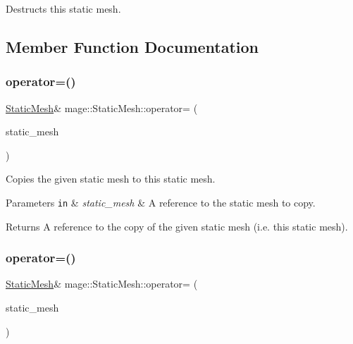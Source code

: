 Destructs this static mesh. 

\subsection{Member Function Documentation}
\hypertarget{classmage_1_1_static_mesh_af73dd102f2de9cf7529e380895cfc8ff}{}\label{classmage_1_1_static_mesh_af73dd102f2de9cf7529e380895cfc8ff} 
\subsubsection{\texorpdfstring{operator=()}{operator=()}\hspace{0.1cm}{\footnotesize\ttfamily [1/2]}}
{\footnotesize\ttfamily \hyperlink{classmage_1_1_static_mesh}{Static\+Mesh}\& mage\+::\+Static\+Mesh\+::operator= (\begin{DoxyParamCaption}\item[{const \hyperlink{classmage_1_1_static_mesh}{Static\+Mesh} \&}]{static\+\_\+mesh }\end{DoxyParamCaption})\hspace{0.3cm}{\ttfamily [delete]}}

Copies the given static mesh to this static mesh.


\begin{DoxyParams}[1]{Parameters}
\mbox{\tt in}  & {\em static\+\_\+mesh} & A reference to the static mesh to copy. \\
\hline
\end{DoxyParams}
\begin{DoxyReturn}{Returns}
A reference to the copy of the given static mesh (i.\+e. this static mesh). 
\end{DoxyReturn}
\hypertarget{classmage_1_1_static_mesh_a38912f8555053abba649bea160d56e46}{}\label{classmage_1_1_static_mesh_a38912f8555053abba649bea160d56e46} 
\subsubsection{\texorpdfstring{operator=()}{operator=()}\hspace{0.1cm}{\footnotesize\ttfamily [2/2]}}
{\footnotesize\ttfamily \hyperlink{classmage_1_1_static_mesh}{Static\+Mesh}\& mage\+::\+Static\+Mesh\+::operator= (\begin{DoxyParamCaption}\item[{\hyperlink{classmage_1_1_static_mesh}{Static\+Mesh} \&\&}]{static\+\_\+mesh }\end{DoxyParamCaption})\hspace{0.3cm}{\ttfamily [delete]}}

